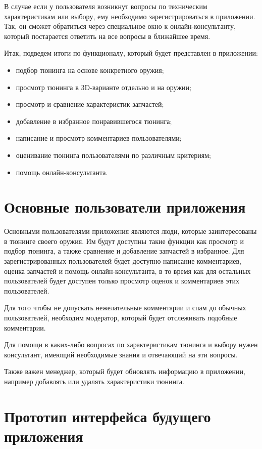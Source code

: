 \documentclass[14pt]{extreport}
\begin{document}
В случае если у пользователя возникнут вопросы по техническим характеристикам или выбору, ему необходимо зарегистрироваться в приложении. Так, он сможет обратиться через специальное окно к онлайн-консультанту, который постарается ответить на все вопросы в ближайшее время.

Итак, подведем итоги по функционалу, который будет представлен в приложении:
\begin{itemize}
\item подбор тюнинга на основе конкретного оружия;
\item просмотр тюнинга в 3D-варианте отдельно и на оружии;
\item просмотр и сравнение характеристик запчастей;
\item добавление в избранное понравившегося тюнинга;
\item написание и просмотр комментариев пользователями;
\item оценивание тюнинга пользователями по различным критериям;
\item помощь онлайн-консультанта.
\end{itemize}

\newpage
\section{Основные пользователи приложения}

Основными пользователями приложения являются люди, которые заинтересованы в тюнинге своего оружия. Им будут доступны такие функции как просмотр и подбор тюнинга, а также сравнение и добавление запчастей в избранное. Для зарегистрированных пользователей будет доступно написание комментариев, оценка запчастей и помощь онлайн-консультанта, в то время как для остальных пользователей будет доступен только просмотр оценок и комментариев этих пользователей.

Для того чтобы не допускать нежелательные комментарии и спам до обычных пользователей, необходим модератор, который будет отслеживать подобные комментарии.

Для помощи в каких-либо вопросах по характеристикам тюнинга и выбору нужен консультант, имеющий необходимые знания и отвечающий на эти вопросы.

Также важен менеджер, который будет обновлять информацию в приложении, например добавлять или удалять характеристики тюнинга.

\newpage
\section{Прототип интерфейса будущего приложения}
\end{document}
